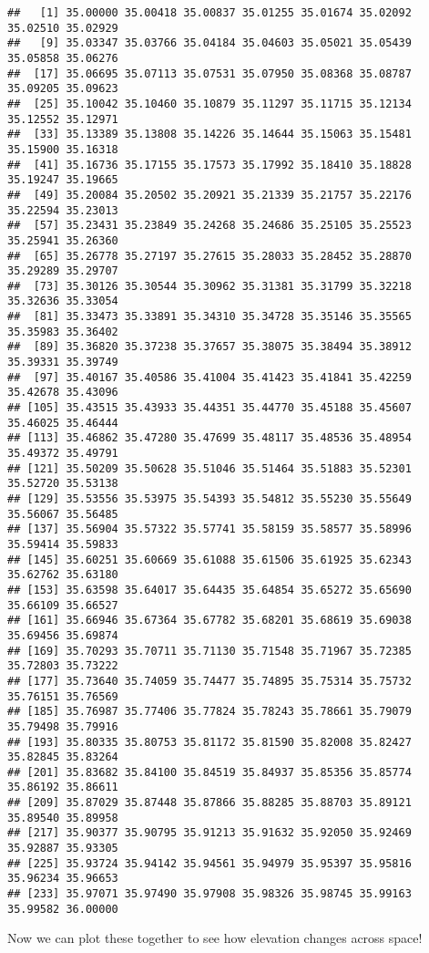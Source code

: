 \documentclass[
]{book}
\begin{document}
\begin{verbatim}
##   [1] 35.00000 35.00418 35.00837 35.01255 35.01674 35.02092 35.02510 35.02929
##   [9] 35.03347 35.03766 35.04184 35.04603 35.05021 35.05439 35.05858 35.06276
##  [17] 35.06695 35.07113 35.07531 35.07950 35.08368 35.08787 35.09205 35.09623
##  [25] 35.10042 35.10460 35.10879 35.11297 35.11715 35.12134 35.12552 35.12971
##  [33] 35.13389 35.13808 35.14226 35.14644 35.15063 35.15481 35.15900 35.16318
##  [41] 35.16736 35.17155 35.17573 35.17992 35.18410 35.18828 35.19247 35.19665
##  [49] 35.20084 35.20502 35.20921 35.21339 35.21757 35.22176 35.22594 35.23013
##  [57] 35.23431 35.23849 35.24268 35.24686 35.25105 35.25523 35.25941 35.26360
##  [65] 35.26778 35.27197 35.27615 35.28033 35.28452 35.28870 35.29289 35.29707
##  [73] 35.30126 35.30544 35.30962 35.31381 35.31799 35.32218 35.32636 35.33054
##  [81] 35.33473 35.33891 35.34310 35.34728 35.35146 35.35565 35.35983 35.36402
##  [89] 35.36820 35.37238 35.37657 35.38075 35.38494 35.38912 35.39331 35.39749
##  [97] 35.40167 35.40586 35.41004 35.41423 35.41841 35.42259 35.42678 35.43096
## [105] 35.43515 35.43933 35.44351 35.44770 35.45188 35.45607 35.46025 35.46444
## [113] 35.46862 35.47280 35.47699 35.48117 35.48536 35.48954 35.49372 35.49791
## [121] 35.50209 35.50628 35.51046 35.51464 35.51883 35.52301 35.52720 35.53138
## [129] 35.53556 35.53975 35.54393 35.54812 35.55230 35.55649 35.56067 35.56485
## [137] 35.56904 35.57322 35.57741 35.58159 35.58577 35.58996 35.59414 35.59833
## [145] 35.60251 35.60669 35.61088 35.61506 35.61925 35.62343 35.62762 35.63180
## [153] 35.63598 35.64017 35.64435 35.64854 35.65272 35.65690 35.66109 35.66527
## [161] 35.66946 35.67364 35.67782 35.68201 35.68619 35.69038 35.69456 35.69874
## [169] 35.70293 35.70711 35.71130 35.71548 35.71967 35.72385 35.72803 35.73222
## [177] 35.73640 35.74059 35.74477 35.74895 35.75314 35.75732 35.76151 35.76569
## [185] 35.76987 35.77406 35.77824 35.78243 35.78661 35.79079 35.79498 35.79916
## [193] 35.80335 35.80753 35.81172 35.81590 35.82008 35.82427 35.82845 35.83264
## [201] 35.83682 35.84100 35.84519 35.84937 35.85356 35.85774 35.86192 35.86611
## [209] 35.87029 35.87448 35.87866 35.88285 35.88703 35.89121 35.89540 35.89958
## [217] 35.90377 35.90795 35.91213 35.91632 35.92050 35.92469 35.92887 35.93305
## [225] 35.93724 35.94142 35.94561 35.94979 35.95397 35.95816 35.96234 35.96653
## [233] 35.97071 35.97490 35.97908 35.98326 35.98745 35.99163 35.99582 36.00000
\end{verbatim}

Now we can plot these together to see how elevation changes across space!
\end{document}
